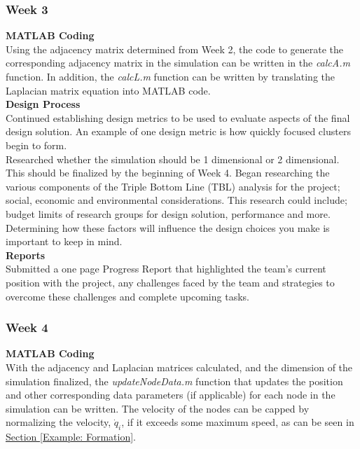 \documentclass[../CourseManual.tex]{subfiles}
\begin{document}
\subsubsection{Week 3} \label{Week 3: Opinion}
\textbf{MATLAB Coding}\\
Using the adjacency matrix determined from Week 2, the code to generate the corresponding adjacency matrix in the simulation can be written in the \textit{calcA.m} function. In addition, the \textit{calcL.m} function can be written by translating the Laplacian matrix equation into MATLAB code.\\

\textbf{Design Process}\\
Continued establishing design metrics to be used to evaluate aspects of the final design solution. An example of one design metric is how quickly focused clusters begin to form. \\

Researched whether the simulation should be 1 dimensional or 2 dimensional. This should be finalized by the beginning of Week 4. Began researching the various components of the Triple Bottom Line (TBL) analysis for the project; social, economic and environmental considerations. This research could include; budget limits of research groups for design solution, performance and more. Determining how these factors will influence the design choices you make is important to keep in mind.\\

\textbf{Reports}\\
Submitted a one page Progress Report that highlighted the team's current position with the project, any challenges faced by the team and strategies to overcome these challenges and complete upcoming tasks.

\subsubsection{Week 4} \label{Week 4: Opinion}
\textbf{MATLAB Coding}\\
With the adjacency and Laplacian matrices calculated, and the dimension of the simulation finalized, the \textit{updateNodeData.m} function that updates the position and other corresponding data parameters (if applicable) for each node in the simulation can be written. The velocity of the nodes can be capped by normalizing the velocity, $\dot{q}_i$, if it exceeds some maximum speed, as can be seen in \hyperref[Example: Formation]{Section \ref{Example: Formation}}.\\ 
\end{document}

